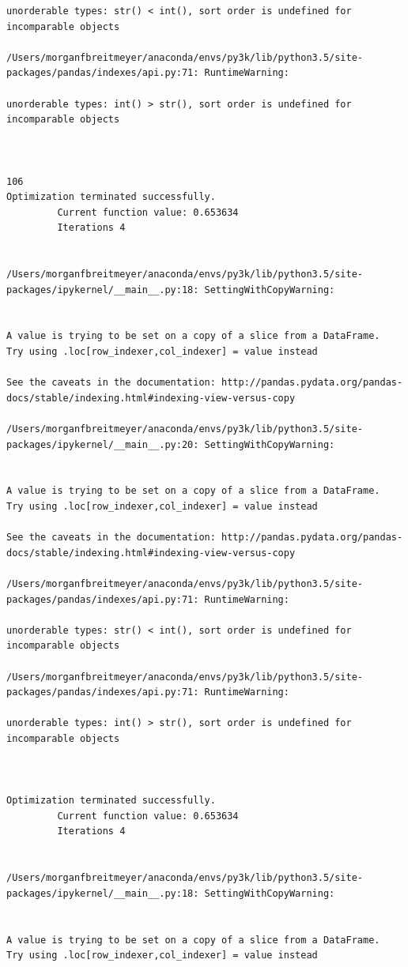 \begin{lstlisting}
unorderable types: str() < int(), sort order is undefined for incomparable objects

/Users/morganfbreitmeyer/anaconda/envs/py3k/lib/python3.5/site-packages/pandas/indexes/api.py:71: RuntimeWarning:

unorderable types: int() > str(), sort order is undefined for incomparable objects



106
Optimization terminated successfully.
         Current function value: 0.653634
         Iterations 4


/Users/morganfbreitmeyer/anaconda/envs/py3k/lib/python3.5/site-packages/ipykernel/__main__.py:18: SettingWithCopyWarning:


A value is trying to be set on a copy of a slice from a DataFrame.
Try using .loc[row_indexer,col_indexer] = value instead

See the caveats in the documentation: http://pandas.pydata.org/pandas-docs/stable/indexing.html#indexing-view-versus-copy

/Users/morganfbreitmeyer/anaconda/envs/py3k/lib/python3.5/site-packages/ipykernel/__main__.py:20: SettingWithCopyWarning:


A value is trying to be set on a copy of a slice from a DataFrame.
Try using .loc[row_indexer,col_indexer] = value instead

See the caveats in the documentation: http://pandas.pydata.org/pandas-docs/stable/indexing.html#indexing-view-versus-copy

/Users/morganfbreitmeyer/anaconda/envs/py3k/lib/python3.5/site-packages/pandas/indexes/api.py:71: RuntimeWarning:

unorderable types: str() < int(), sort order is undefined for incomparable objects

/Users/morganfbreitmeyer/anaconda/envs/py3k/lib/python3.5/site-packages/pandas/indexes/api.py:71: RuntimeWarning:

unorderable types: int() > str(), sort order is undefined for incomparable objects



Optimization terminated successfully.
         Current function value: 0.653634
         Iterations 4


/Users/morganfbreitmeyer/anaconda/envs/py3k/lib/python3.5/site-packages/ipykernel/__main__.py:18: SettingWithCopyWarning:


A value is trying to be set on a copy of a slice from a DataFrame.
Try using .loc[row_indexer,col_indexer] = value instead


\end{lstlisting}
